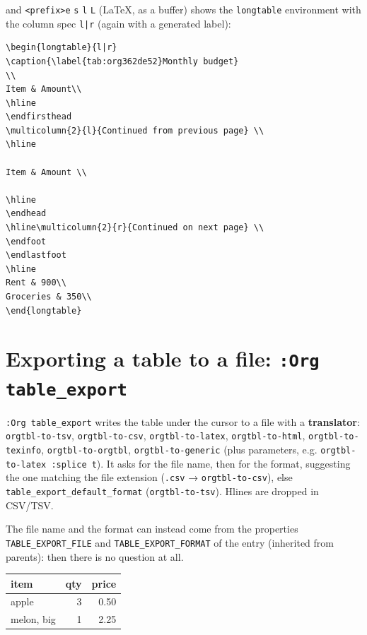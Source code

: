 and \texttt{<prefix>e} \texttt{s} \texttt{l} \texttt{L} (\LaTeX{}, as a buffer) shows the \texttt{longtable}
environment with the column spec \texttt{l|r} (again with a generated label):
\begin{verbatim}
\begin{longtable}{l|r}
\caption{\label{tab:org362de52}Monthly budget}
\\
Item & Amount\\
\hline
\endfirsthead
\multicolumn{2}{l}{Continued from previous page} \\
\hline

Item & Amount \\

\hline
\endhead
\hline\multicolumn{2}{r}{Continued on next page} \\
\endfoot
\endlastfoot
\hline
Rent & 900\\
Groceries & 350\\
\end{longtable}
\end{verbatim}
\section{Exporting a table to a file: \texttt{:Org table\_export}}
\label{sec:orga657571}
\texttt{:Org table\_export} writes the table under the cursor to a file with a
\textbf{translator}: \texttt{orgtbl-to-tsv}, \texttt{orgtbl-to-csv}, \texttt{orgtbl-to-latex},
\texttt{orgtbl-to-html}, \texttt{orgtbl-to-texinfo}, \texttt{orgtbl-to-orgtbl},
\texttt{orgtbl-to-generic} (plus parameters, e.g. \texttt{orgtbl-to-latex :splice t}).
It asks for the file name, then for the format, suggesting the one matching
the file extension (\texttt{.csv} → \texttt{orgtbl-to-csv}), else
\texttt{table\_export\_default\_format} (\texttt{orgtbl-to-tsv}). Hlines are dropped in
CSV/TSV.

The file name and the format can instead come from the properties
\texttt{TABLE\_EXPORT\_FILE} and \texttt{TABLE\_EXPORT\_FORMAT} of the entry (inherited from
parents): then there is no question at all.

\begin{table}[htbp]
\label{tab:org254f1b8}
\centering
\begin{tabular}{lrr}
item & qty & price\\
\hline
apple & 3 & 0.50\\
melon, big & 1 & 2.25\\
\end{tabular}
\end{table}


